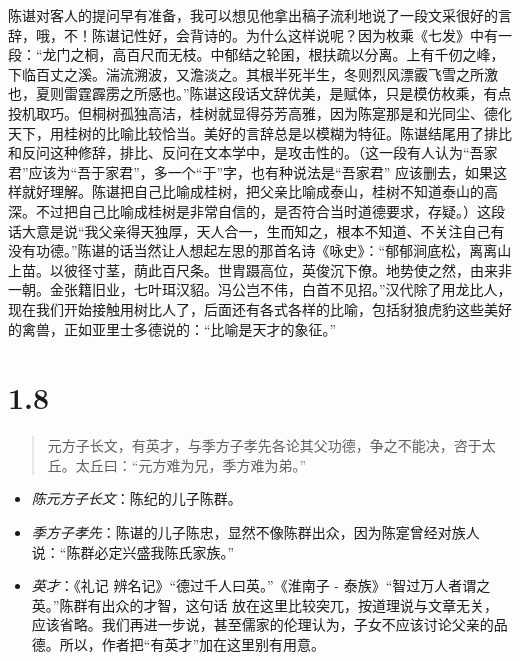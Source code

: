 \documentclass[]{book}
\providecommand{\tightlist}{%
  \setlength{\itemsep}{0pt}\setlength{\parskip}{0pt}}
\begin{document}
陈谌对客人的提问早有准备，我可以想见他拿出稿子流利地说了一段文采很好的言辞，哦，不！陈谌记性好，会背诗的。为什么这样说呢？因为枚乘《七发》中有一段：``龙门之桐，高百尺而无枝。中郁结之轮囷，根扶疏以分离。上有千仞之峰，下临百丈之溪。湍流溯波，又澹淡之。其根半死半生，冬则烈风漂霰飞雪之所激也，夏则雷霆霹雳之所感也。''陈谌这段话文辞优美，是赋体，只是模仿枚乘，有点投机取巧。但桐树孤独高洁，桂树就显得芬芳高雅，因为陈寔那是和光同尘、德化天下，用桂树的比喻比较恰当。美好的言辞总是以模糊为特征。陈谌结尾用了排比和反问这种修辞，排比、反问在文本学中，是攻击性的。（这一段有人认为``吾家君''应该为``吾于家君''，多一个``于''字，也有种说法是``吾家君''
应该删去，如果这样就好理解。陈谌把自己比喻成桂树，把父亲比喻成泰山，桂树不知道泰山的高深。不过把自己比喻成桂树是非常自信的，是否符合当时道德要求，存疑。）这段话大意是说``我父亲得天独厚，天人合一，生而知之，根本不知道、不关注自己有没有功德。''陈谌的话当然让人想起左思的那首名诗《咏史》：``郁郁涧底松，离离山上苗。以彼径寸茎，荫此百尺条。世胄蹑高位，英俊沉下僚。地势使之然，由来非一朝。金张籍旧业，七叶珥汉貂。冯公岂不伟，白首不见招。''汉代除了用龙比人，现在我们开始接触用树比人了，后面还有各式各样的比喻，包括豺狼虎豹这些美好的禽兽，正如亚里士多德说的：``比喻是天才的象征。''

\section{1.8}\label{section-7}

\begin{quote}
元方子长文，有英才，与季方子孝先各论其父功德，争之不能决，咨于太丘。太丘曰：``元方难为兄，季方难为弟。''
\end{quote}

\begin{itemize}
\tightlist
\item
  \emph{陈元方子长文}：陈纪的儿子陈群。
\item
  \emph{季方子孝先}：陈谌的儿子陈忠，显然不像陈群出众，因为陈寔曾经对族人说：``陈群必定兴盛我陈氏家族。''
\item
  \emph{英才}：《礼记 辨名记》``德过千人曰英。''《淮南子 -
  泰族》``智过万人者谓之英。''陈群有出众的才智，这句话
  放在这里比较突兀，按道理说与文章无关，应该省略。我们再进一步说，甚至儒家的伦理认为，子女不应该讨论父亲的品德。所以，作者把``有英才''加在这里别有用意。
\end{itemize}
\end{document}
